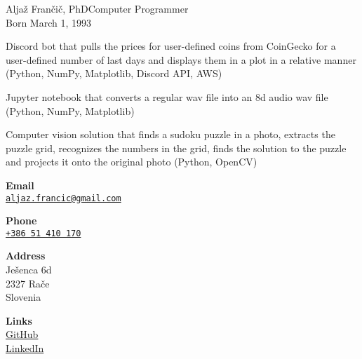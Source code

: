 \documentclass{article}
\begin{document}
\begin{cv}[avatar]{Aljaž Frančič, PhD}{Computer Programmer\\\small{Born March 1, 1993}}
\begin{cvevent}
    Discord bot that pulls the prices for user-defined coins from CoinGecko for a user-defined number of last days and displays them in a plot in a relative manner (Python, NumPy, Matplotlib, Discord API, AWS)
\end{cvevent}

\cvseparator[2]
\begin{cvevent}
    Jupyter notebook that converts a regular wav file into an 8d audio wav file (Python, NumPy, Matplotlib)

\end{cvevent}

\cvseparator[2]
\begin{cvevent}
   Computer vision solution that finds a sudoku puzzle in a photo, extracts the puzzle grid, recognizes the numbers in the grid, finds the solution to the puzzle and projects it onto the original photo (Python, OpenCV)
\end{cvevent}


\cvsidebar %



\begin{cvitem}[Envelope][4]
    \textbf{Email}\\
    \href{mailto:aljaz.francic@gmail.com}{\texttt{aljaz.francic@gmail.com}}
\end{cvitem}

\cvseparator[3]
\begin{cvitem}[Phone][4]
    \textbf{Phone}\\
    \href{tel:+442071234567}{\texttt{+386 51 410 170}}
\end{cvitem}

\cvseparator[3]
\begin{cvitem}[Home][4]
    \textbf{Address}\\
    Ješenca 6d\\ 2327 Rače \\ Slovenia
\end{cvitem}

\cvseparator[3]
\begin{cvitem}[Globe][4]
     \textbf{Links}\\
     \href{https://github.com/aljazfrancic}{GitHub}\\
     \href{https://www.linkedin.com/in/aljazfrancic}{LinkedIn}
\end{cvitem}



\end{cv}
\end{document}
